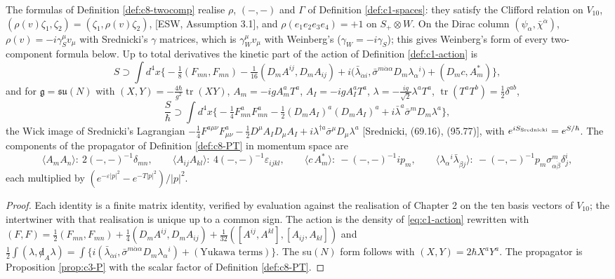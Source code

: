 \begin{proposition}
\label{prop:c8-twocomp}
The formulas of Definition \ref{def:c8-twocomp} realise $\rho$, $(-,-)$ and $\Gamma$ of Definition \ref{def:c1-spaces}: they satisfy the Clifford relation on $V_{10}$, $(\rho(v)\zeta_1,\zeta_2)=(\zeta_1,\rho(v)\zeta_2)$, [ESW, Assumption 3.1], and $\rho(e_1e_2e_3e_4)=+1$ on $S_+\otimes W$. On the Dirac column $(\psi_\alpha,\bar\chi^{\dot\alpha})$, $\rho(v)=-i\gamma_S^\mu v_\mu$ with Srednicki's $\gamma$ matrices, which is $\gamma_W^\mu v_\mu$ with Weinberg's ($\gamma_W=-i\gamma_S$); this gives Weinberg's form of every two-component formula below. Up to total derivatives the kinetic part of the action of Definition \ref{def:c1-action} is
\[
S\supset\int d^4x\Big\{-\tfrac18(F_{mn},F_{mn})-\tfrac1{16}(D_mA^{ij},D_mA_{ij})+i\big(\bar\lambda_{\dot\alpha i},\bar\sigma^{m\dot\alpha\alpha}D_m\lambda_\alpha{}^i\big)+(D_mc,A^*_m)\Big\},
\]
and for $\mathfrak g=\mathfrak{su}(N)$ with $(X,Y)=-\tfrac{4\hbar}{g^2}\operatorname{tr}(XY)$, $A_m=-igA^a_mT^a$, $A_I=-igA^a_IT^a$, $\lambda=-\tfrac{ig}{\sqrt2}\lambda^aT^a$, $\operatorname{tr}(T^aT^b)=\tfrac12\delta^{ab}$,
\[
\frac S\hbar\supset\int d^4x\Big\{-\tfrac14F^a_{mn}F^a_{mn}-\tfrac12(D_mA_I)^a(D_mA_I)^a+i\bar\lambda^a\bar\sigma^mD_m\lambda^a\Big\},
\]
the Wick image of Srednicki's Lagrangian $-\tfrac14F^{a\mu\nu}F^a_{\mu\nu}-\tfrac12D^\mu A_ID_\mu A_I+i\lambda^{\dagger a}\bar\sigma^\mu D_\mu\lambda^a$ [Srednicki, (69.16), (95.77)], with $e^{iS_{\rm Srednicki}}=e^{S/\hbar}$. The components of the propagator of Definition \ref{def:c8-PT} in momentum space are
\[
\langle A_mA_n\rangle:\ 2(-,-)^{-1}\delta_{mn},\qquad \langle A_{ij}A_{kl}\rangle:\ 4(-,-)^{-1}\varepsilon_{ijkl},\qquad \langle c\,A^*_m\rangle:\ -(-,-)^{-1}ip_m,\qquad \langle\lambda_\alpha{}^i\bar\lambda_{\dot\beta j}\rangle:\ -(-,-)^{-1}p_m\sigma^m_{\alpha\dot\beta}\delta^i_j,
\]
each multiplied by $(e^{-\varepsilon|p|^2}-e^{-T|p|^2})/|p|^2$.
\end{proposition}

\begin{proof}
Each identity is a finite matrix identity, verified by evaluation against the realisation of Chapter 2 on the ten basis vectors of $V_{10}$; the intertwiner with that realisation is unique up to a common sign. The action is the density of \eqref{eq:c1-action} rewritten with $(F,F)=\tfrac12(F_{mn},F_{mn})+\tfrac14(D_mA^{ij},D_mA_{ij})+\tfrac1{32}([A^{ij},A^{kl}],[A_{ij},A_{kl}])$ and $\tfrac12\int(\lambda,{\not d}_A\lambda)=\int\big\{i(\bar\lambda_{\dot\alpha i},\bar\sigma^{m\dot\alpha\alpha}D_m\lambda_\alpha{}^i)+(\text{Yukawa terms})\big\}$. The su$(N)$ form follows with $(X,Y)=2\hbar X^aY^a$. The propagator is Proposition \ref{prop:c3-P} with the scalar factor of Definition \ref{def:c8-PT}.
\end{proof}

